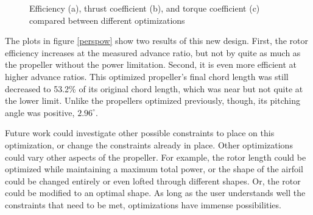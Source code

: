 \documentclass[journal ]{new-aiaa}
\begin{document}
\begin{figure}[H]
\centering

	\hspace{1em}
	\caption{Efficiency (a), thrust coefficient (b), and torque coefficient (c) compared between different optimizations}
	\captionsetup{aboveskip=0pt,font=it}
	\label{perspow}
\end{figure}

The plots in figure \eqref{perspow} show two results of this new design. First, the rotor efficiency increases at the measured advance ratio, but not by quite as much as the propeller without the power limitation. Second, it is even more efficient at higher advance ratios. This optimized propeller's final chord length was still decreased to 53.2\% of its original chord length, which was near but not quite at the lower limit. Unlike the propellers optimized previously, though, its pitching angle was positive, $2.96^{\circ}$.

Future work could investigate other possible constraints to place on this optimization, or change the constraints already in place. Other optimizations could vary other aspects of the propeller. For example, the rotor length could be optimized while maintaining a maximum total power, or the shape of the airfoil could be changed entirely or even lofted through different shapes. Or, the rotor could be modified to an optimal shape. As long as the user understands well the constraints that need to be met, optimizations have immense possibilities.
\end{document}
